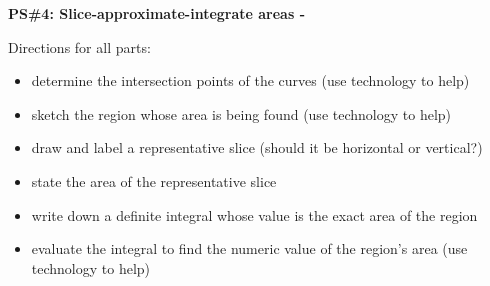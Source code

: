 \documentclass[10pt]{article}
\renewcommand{\section}[1]{\begin{center} \textbf{#1} \\\end{center}}
\begin{document}
%


\allowdisplaybreaks
\section{PS\#4: Slice-approximate-integrate areas - \red{Answer key} }

Directions for all parts:
\begin{itemize}
    \item determine the intersection points of the curves (use technology to help)
    \item sketch the region whose area is being found (use technology to help)
    \item draw and label a representative slice (should it be horizontal or vertical?)
    \item state the area of the representative slice
    \item write down a definite integral whose value is the exact area of the region
    \item evaluate the integral to find the numeric value of the region's area (use technology to help)
\end{itemize}
\end{document}
